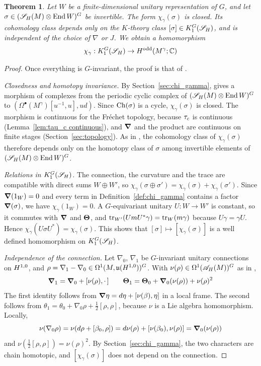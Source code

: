 \documentclass[11pt]{amsart}
\theoremstyle{plain}
\newtheorem{theorem}{Theorem}[section]
\theoremstyle{definition}
\theoremstyle{remark}
\begin{document}
\begin{theorem}\label{thm:chi_gamma well defined}
Let $W$ be a finite-dimensional unitary representation of $G$, and let $\sigma\in({\mathscr{S}_H}(M)\otimes\operatorname{End} W)^G$ be invertible.
The form $\chi_\gamma(\sigma)$ is closed.
Its cohomology class depends only on the $K$-theory class  $[\sigma]\in K_1^G({\mathscr{S}_H})$, and is independent of the choice of $\nabla$ or $J$.
We obtain a homomorphism
\[ \chi_\gamma:K_1^G({\mathscr{S}_H})\to H^{\mathrm{odd}}(M^\gamma;{\mathbb{C}})\]
\end{theorem}
\begin{proof}
Once everything is $G$-invariant, the proof is that of \cite[Theorem~6.7]{GvE20}.

\emph{Closedness and homotopy invariance.}
By Section~\ref{sec:chi_gamma}, \cite[Theorem~6.1]{GvE20} gives a morphism of complexes from the periodic cyclic complex of $({\mathscr{S}_H}(M)\otimes\operatorname{End} W)^G$ to $(\Omega^\bullet(M^\gamma)[u^{-1},u],ud)$.
Since $\operatorname{Ch}(\sigma)$ is a cycle, $\chi_\gamma(\sigma)$ is closed.
The morphism is continuous for the Fr\'echet topology, because $\tau_{c}$ is continuous (Lemma~\ref{lem:tau_c continuous}), and $\boldsymbol{\nabla}$ and the product are continuous on finite stages (Section~\ref{sec:topology}).
As in \cite[Section~6.3]{GvE20}, the cohomology class of $\chi_\gamma(\sigma)$ therefore depends only on the homotopy class of $\sigma$ among invertible elements of $({\mathscr{S}_H}(M)\otimes\operatorname{End} W)^G$.

\emph{Relations in $K_1^G({\mathscr{S}_H})$.}
The connection, the curvature and the trace are compatible with direct sums $W\oplus W'$, so $\chi_\gamma(\sigma\oplus\sigma')=\chi_\gamma(\sigma)+\chi_\gamma(\sigma')$.
Since $\boldsymbol{\nabla}(1_W)=0$ and every term in Definition~\ref{def:chi_gamma} contains a factor $\boldsymbol{\nabla}(\sigma)$, we have $\chi_\gamma(1_W)=0$.
A $G$-equivariant unitary $U:W\to W'$ is constant, so it commutes with $\boldsymbol{\nabla}$ and $\boldsymbol{\Theta}$, and $\operatorname{tr}_{W'}(UmU^*\gamma)=\operatorname{tr}_W(m\gamma)$ because $U\gamma=\gamma U$.
Hence $\chi_\gamma(U\sigma U^*)=\chi_\gamma(\sigma)$.
This shows that $[\sigma]\mapsto[\chi_\gamma(\sigma)]$ is a well defined homomorphism on $K_1^G({\mathscr{S}_H})$.

\emph{Independence of the connection.}
Let $\nabla_0$, $\nabla_1$ be $G$-invariant unitary connections on $H^{1,0}$, and $\rho=\nabla_1-\nabla_0\in\Omega^1(M,\mathfrak{u}(H^{1,0}))^G$.
With  $\nu(\rho)\in\Omega^1({\mathscr{A}}_H(M))^G$ as in \cite[Lemma~4.5]{GvE20},
\[ \boldsymbol{\nabla}_1=\boldsymbol{\nabla}_0+[\nu(\rho),\cdot\,]\qquad \boldsymbol{\Theta}_1=\boldsymbol{\Theta}_0+\boldsymbol{\nabla}_0(\nu(\rho))+\nu(\rho)^2\]
The first identity follows from $\boldsymbol{\nabla}\eta=d\eta+[\nu(\beta),\eta]$ in a local frame.
The second follows from $\theta_1=\theta_0+\nabla_0\rho+\frac12[\rho,\rho]$, because $\nu$ is a Lie algebra homomorphism.
Locally,
\[\nu(\nabla_0\rho)=\nu(d\rho+[\beta_0,\rho])=d\nu(\rho)+[\nu(\beta_0),\nu(\rho)]=\boldsymbol{\nabla}_0(\nu(\rho))\] 
and $\nu(\frac12[\rho,\rho])=\nu(\rho)^2$.
By Section~\ref{sec:chi_gamma}, the two characters are chain homotopic, and $[\chi_\gamma(\sigma)]$ does not depend on the connection.


\end{proof}
\end{document}
